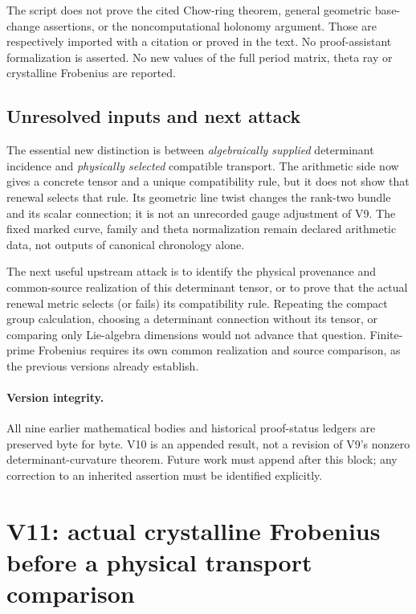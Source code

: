 \documentclass[11pt]{article}
\theoremstyle{definition}
\theoremstyle{remark}
\begin{document}
The script does not prove the cited Chow-ring theorem, general geometric
base-change assertions, or the noncomputational holonomy argument.
Those are respectively imported with a citation or proved in the text.
No proof-assistant formalization is asserted. No new values of the full
period matrix, theta ray or crystalline Frobenius are reported.

\subsection{Unresolved inputs and next attack}
The essential new distinction is between \emph{algebraically supplied}
determinant incidence and \emph{physically selected} compatible transport.
The arithmetic side now gives a concrete tensor and a unique compatibility
rule, but it does not show that renewal selects that rule. Its geometric
line twist changes the rank-two bundle and its scalar connection; it is
not an unrecorded gauge adjustment of V9. The fixed marked curve, family
and theta normalization remain declared arithmetic data, not outputs of
canonical chronology alone.

The next useful upstream attack is to identify the physical provenance and
common-source realization of this determinant tensor, or to prove that the
actual renewal metric selects (or fails) its compatibility rule. Repeating
the compact group calculation, choosing a determinant connection without
its tensor, or comparing only Lie-algebra dimensions would not advance that
question. Finite-prime Frobenius requires its own common realization and
source comparison, as the previous versions already establish.

\paragraph{Version integrity.}
All nine earlier mathematical bodies and historical proof-status ledgers
are preserved byte for byte. V10 is an appended result, not a revision of
V9's nonzero determinant-curvature theorem. Future work must append after
this block; any correction to an inherited assertion must be identified
explicitly.

\clearpage
\section{V11: actual crystalline Frobenius before a physical transport comparison}
\label{sec:v11-context}
\end{document}
